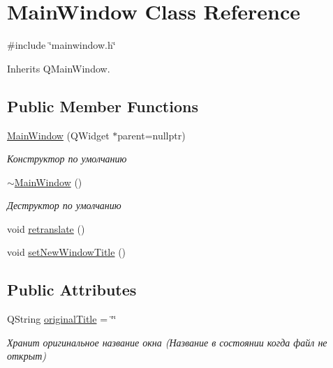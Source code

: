 \hypertarget{class_main_window}{}\section{Main\+Window Class Reference}
\label{class_main_window}


{\ttfamily \#include \char`\"{}mainwindow.\+h\char`\"{}}



Inherits Q\+Main\+Window.

\subsection*{Public Member Functions}
\begin{DoxyCompactItemize}
\item 
\mbox{\label{class_main_window_a996c5a2b6f77944776856f08ec30858d}} 
\mbox{\hyperlink{class_main_window_a996c5a2b6f77944776856f08ec30858d}{Main\+Window}} (Q\+Widget $\ast$parent=nullptr)
\begin{DoxyCompactList}\small\item\em Конструктор по умолчанию \end{DoxyCompactList}\item 
\mbox{\label{class_main_window_ae98d00a93bc118200eeef9f9bba1dba7}} 
\mbox{\hyperlink{class_main_window_ae98d00a93bc118200eeef9f9bba1dba7}{$\sim$\+Main\+Window}} ()
\begin{DoxyCompactList}\small\item\em Деструктор по умолчанию \end{DoxyCompactList}\item 
void \mbox{\hyperlink{class_main_window_ae8662ae2ae5fc1d7921a9b18ec38ae9d}{retranslate}} ()
\item 
void \mbox{\hyperlink{class_main_window_aae88cde8d3fc8fe658a2ba01cb2495e1}{set\+New\+Window\+Title}} ()
\end{DoxyCompactItemize}
\subsection*{Public Attributes}
\begin{DoxyCompactItemize}
\item 
\mbox{\label{class_main_window_a5792d0b9164c214e10da5828d2e29a3c}} 
Q\+String \mbox{\hyperlink{class_main_window_a5792d0b9164c214e10da5828d2e29a3c}{original\+Title}} = \char`\"{}\char`\"{}
\begin{DoxyCompactList}\small\item\em Хранит оригинальное название окна (Название в состоянии когда файл не открыт) \end{DoxyCompactList}\end{DoxyCompactItemize}
